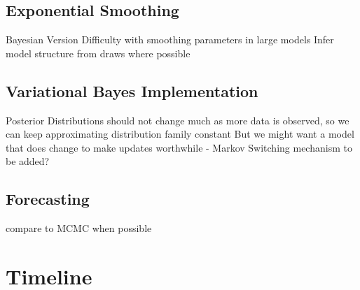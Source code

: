 \documentclass{article}\usepackage[]{graphicx}\usepackage[]{color}
\numberwithin{equation}{section}
\begin{document}
\subsection{Exponential Smoothing}
Bayesian Version
Difficulty with smoothing parameters in large models
Infer model structure from draws where possible
\subsection{Variational Bayes Implementation}
Posterior Distributions should not change much as more data is observed, so we can keep approximating distribution family constant
But we might want a model that does change to make updates worthwhile - Markov Switching mechanism to be added?
\subsection{Forecasting}
compare to MCMC when possible

\section{Timeline}



\end{document}
